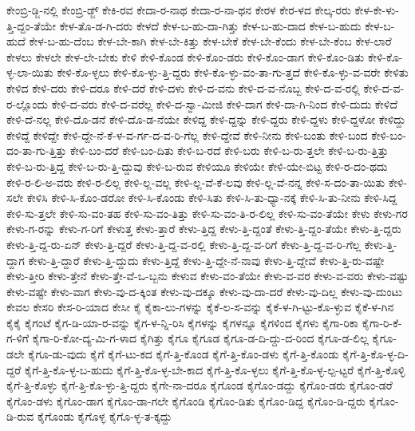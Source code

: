{ಕೇಂಬ್ರಿ-ಡ್ಜಿ-ನಲ್ಲಿ
ಕೇಂಬ್ರಿ-ಡ್ಜ್
ಕೇಕಿ-ರವ
ಕೇದಾ-ರ-ನಾಥ
ಕೇದಾ-ರ-ನಾ-ಥನ
ಕೇರಳ
ಕೇರ-ಳದ
ಕೇಲ್ಕ-ರರು
ಕೇಳ-ಕೇ-ಳು-ತ್ತಿ-ದ್ದಂ-ತೆಯೇ
ಕೇಳ-ತೊ-ಡ-ಗಿ-ದರು
ಕೇಳದೆ
ಕೇಳ-ಬ-ಹು-ದಾ-ಗಿತ್ತು
ಕೇಳ-ಬ-ಹು-ದಾದ
ಕೇಳ-ಬ-ಹುದು
ಕೇಳ-ಬ-ಹುದೆ
ಕೇಳ-ಬ-ಹು-ದೆಂಬ
ಕೇಳ-ಬೇ-ಕಾಗಿ
ಕೇಳ-ಬೇ-ಕಿತ್ತು
ಕೇಳ-ಬೇಕೆ
ಕೇಳ-ಬೇ-ಕೆಂದು
ಕೇಳ-ಬೇ-ಕೆಂಬ
ಕೇಳ-ಲಾರೆ
ಕೇಳಲು
ಕೇಳಲೇ
ಕೇಳ-ಲೇ-ಬೇಕು
ಕೇಳಿ
ಕೇಳಿ-ಕೊಂಡ
ಕೇಳಿ-ಕೊಂ-ಡರು
ಕೇಳಿ-ಕೊಂ-ಡಾಗ
ಕೇಳಿ-ಕೊಂ-ಡಿತು
ಕೇಳಿ-ಕೊ-ಳ್ಳ-ಲಾ-ಯಿತು
ಕೇಳಿ-ಕೊ-ಳ್ಳಲು
ಕೇಳಿ-ಕೊ-ಳ್ಳು-ತ್ತಿ-ದ್ದರು
ಕೇಳಿ-ಕೊ-ಳ್ಳು-ವಂ-ತಾ-ಗು-ತ್ತದೆ
ಕೇಳಿ-ಕೊ-ಳ್ಳು-ವ-ವರೇ
ಕೇಳಿತು
ಕೇಳಿದ
ಕೇಳಿ-ದರು
ಕೇಳಿ-ದರೂ
ಕೇಳಿ-ದರೆ
ಕೇಳಿ-ದಳು
ಕೇಳಿ-ದ-ವನು
ಕೇಳಿ-ದ-ವ-ನೊಬ್ಬ
ಕೇಳಿ-ದ-ವ-ರಲ್ಲಿ
ಕೇಳಿ-ದ-ವ-ರ-ಲ್ಲೊಂದು
ಕೇಳಿ-ದ-ವರು
ಕೇಳಿ-ದ-ವರೆಲ್ಲ
ಕೇಳಿ-ದ-ಸ್ವಾ-ಮೀಜಿ
ಕೇಳಿ-ದಾಗ
ಕೇಳಿ-ದಾ-ಗಿ-ನಿಂದ
ಕೇಳಿ-ದುದು
ಕೇಳಿದೆ
ಕೇಳಿ-ದೆ-ನಲ್ಲ
ಕೇಳಿ-ದೊ-ಡನೆ
ಕೇಳಿ-ದೊ-ಡ-ನೆಯೇ
ಕೇಳಿದ್ದ
ಕೇಳಿ-ದ್ದನ್ನು
ಕೇಳಿ-ದ್ದರು
ಕೇಳಿ-ದ್ದಳು
ಕೇಳಿ-ದ್ದಳೋ
ಕೇಳಿದ್ದು
ಕೇಳಿದ್ದೆ
ಕೇಳಿದ್ದೇ
ಕೇಳಿ-ದ್ದೇ-ನೆ-ಕೆ-ಳ-ವ-ರ್ಗ-ದ-ವ-ರಿ-ಗೆಲ್ಲ
ಕೇಳಿ-ದ್ದೇವೆ
ಕೇಳಿ-ನೀನು
ಕೇಳಿ-ಬಂತು
ಕೇಳಿ-ಬಂದ
ಕೇಳಿ-ಬಂ-ದಂ-ತಾ-ಗು-ತ್ತಿತ್ತು
ಕೇಳಿ-ಬಂ-ದರೆ
ಕೇಳಿ-ಬಂ-ದಿತು
ಕೇಳಿ-ಬ-ರದೆ
ಕೇಳಿ-ಬರು
ಕೇಳಿ-ಬ-ರು-ತ್ತಲೇ
ಕೇಳಿ-ಬ-ರು-ತ್ತಿತ್ತು
ಕೇಳಿ-ಬ-ರು-ತ್ತಿದ್ದ
ಕೇಳಿ-ಬ-ರು-ತ್ತಿ-ದ್ದುವು
ಕೇಳಿ-ಬ-ರುವ
ಕೇಳಿಯೂ
ಕೇಳಿಯೇ
ಕೇಳಿ-ಯೇ-ಬಿಟ್ಟ
ಕೇಳಿ-ರ-ದಂ-ಥದು
ಕೇಳಿ-ರ-ಲಿ-ಅ-ವರು
ಕೇಳಿ-ರ-ಲಿಲ್ಲ
ಕೇಳಿ-ಲ್ಲ-ವಲ್ಲ
ಕೇಳಿ-ಲ್ಲ-ವೆ-ಕೆ-ಲವು
ಕೇಳಿ-ಲ್ಲ-ವೆ-ನನ್ನ
ಕೇಳಿ-ಸ-ದಂ-ತಾ-ಯಿತು
ಕೇಳಿ-ಸಲೇ
ಕೇಳಿಸಿ
ಕೇಳಿ-ಸಿ-ಕೊಂ-ಡರೋ
ಕೇಳಿ-ಸಿ-ಕೊಂಡು
ಕೇಳಿ-ಸಿತು
ಕೇಳಿ-ಸಿ-ತು-ಧ್ಯಾ-ನಕ್ಕೆ
ಕೇಳಿ-ಸಿ-ತು-ನೀನು
ಕೇಳಿ-ಸಿದ್ದ
ಕೇಳಿ-ಸು-ತ್ತಲೇ
ಕೇಳಿ-ಸು-ವಂ-ತಹ
ಕೇಳಿ-ಸು-ವಂ-ತಿತ್ತು
ಕೇಳಿ-ಸು-ವಂ-ತಿ-ರ-ಲಿಲ್ಲ
ಕೇಳಿ-ಸು-ವಂ-ತೆಯೇ
ಕೇಳು
ಕೇಳು-ಗರ
ಕೇಳು-ಗ-ರನ್ನು
ಕೇಳು-ಗ-ರಿಗೆ
ಕೇಳುತ್ತ
ಕೇಳು-ತ್ತಾರೆ
ಕೇಳು-ತ್ತಿದ್ದ
ಕೇಳು-ತ್ತಿ-ದ್ದಂತೆ
ಕೇಳು-ತ್ತಿ-ದ್ದಂ-ತೆಯೇ
ಕೇಳು-ತ್ತಿ-ದ್ದರು
ಕೇಳು-ತ್ತಿ-ದ್ದ-ರು-ಏನ್
ಕೇಳು-ತ್ತಿ-ದ್ದರೆ
ಕೇಳು-ತ್ತಿ-ದ್ದ-ವ-ರಲ್ಲಿ
ಕೇಳು-ತ್ತಿ-ದ್ದ-ವ-ರಿಗೆ
ಕೇಳು-ತ್ತಿ-ದ್ದ-ವ-ರಿ-ಗೆಲ್ಲ
ಕೇಳು-ತ್ತಿ-ದ್ದಾಗ
ಕೇಳು-ತ್ತಿ-ದ್ದಾರೆ
ಕೇಳು-ತ್ತಿ-ದ್ದುದು
ಕೇಳು-ತ್ತಿದ್ದೆ
ಕೇಳು-ತ್ತಿ-ದ್ದೇ-ನೆ-ನಾವು
ಕೇಳು-ತ್ತಿ-ದ್ದೇವೆ
ಕೇಳು-ತ್ತಿ-ರು-ವಷ್ಟೇ
ಕೇಳು-ತ್ತೀರಿ
ಕೇಳು-ತ್ತೇನೆ
ಕೇಳು-ತ್ತೇ-ವೆ-ಒ-ಬ್ಬನು
ಕೇಳುವ
ಕೇಳು-ವಂ-ತೆಯೇ
ಕೇಳು-ವ-ವರ
ಕೇಳು-ವ-ವರು
ಕೇಳು-ವಷ್ಟು
ಕೇಳು-ವಷ್ಟೇ
ಕೇಳು-ವಾಗ
ಕೇಳು-ವು-ದ-ಕ್ಕಿಂತ
ಕೇಳು-ವು-ದಕ್ಕೂ
ಕೇಳು-ವು-ದಾ-ದರೆ
ಕೇಳು-ವು-ದಿಲ್ಲ
ಕೇಳು-ವು-ದುಂಟು
ಕೇವಲ
ಕೇಸರಿ
ಕೇಸ-ರಿ-ಯಾದ
ಕೇಸೀ
ಕೈ
ಕೈಕಾ-ಲು-ಗಳನ್ನು
ಕೈಕೆ-ಲ-ಸ-ವನ್ನು
ಕೈಕೆ-ಳ-ಗಿ-ಟ್ಟು-ಕೊ-ಳ್ಳುವ
ಕೈಕೆ-ಳ-ಗಿನ
ಕೈಕೈ
ಕೈಗಂಟೆ
ಕೈಗ-ಡಿ-ಯಾ-ರ-ವನ್ನು
ಕೈಗ-ಳ-ನ್ನಿ-ರಿಸಿ
ಕೈಗಳನ್ನು
ಕೈಗಳನ್ನೂ
ಕೈಗಳಿಂದ
ಕೈಗಳು
ಕೈಗಾ-ರಿಕಾ
ಕೈಗಾ-ರಿ-ಕೆ-ಗ-ಳಿಗೆ
ಕೈಗಾ-ರಿ-ಕೋ-ದ್ಯ-ಮಿ-ಗ-ಳಾದ
ಕೈಗಿತ್ತು
ಕೈಗೂ
ಕೈಗೂಡ
ಕೈಗೂ-ಡ-ದಿ-ದ್ದು-ದ-ರಿಂದ
ಕೈಗೂ-ಡ-ಲಿಲ್ಲ
ಕೈಗೂ-ಡಲೇ
ಕೈಗೂ-ಡು-ವುದು
ಕೈಗೆ
ಕೈಗೆ-ಟು-ಕದ
ಕೈಗೆ-ತ್ತಿ-ಕೊಂಡ
ಕೈಗೆ-ತ್ತಿ-ಕೊಂ-ಡಳು
ಕೈಗೆ-ತ್ತಿ-ಕೊಂಡು
ಕೈಗೆ-ತ್ತಿ-ಕೊ-ಳ್ಳ-ದಿ-ದ್ದರೆ
ಕೈಗೆ-ತ್ತಿ-ಕೊ-ಳ್ಳ-ಬ-ಹುದು
ಕೈಗೆ-ತ್ತಿ-ಕೊ-ಳ್ಳ-ಬೇ-ಕಾದ
ಕೈಗೆ-ತ್ತಿ-ಕೊ-ಳ್ಳಲು
ಕೈಗೆ-ತ್ತಿ-ಕೊ-ಳ್ಳ-ಲ್ಪ-ಟ್ಟರೆ
ಕೈಗೆ-ತ್ತಿ-ಕೊಳ್ಳಿ
ಕೈಗೆ-ತ್ತಿ-ಕೊಳ್ಳು
ಕೈಗೆ-ತ್ತಿ-ಕೊ-ಳ್ಳು-ತ್ತಿ-ದ್ದರು
ಕೈಗೇ-ನಾ-ದರೂ
ಕೈಗೊಂಡ
ಕೈಗೊಂ-ಡದ್ದು
ಕೈಗೊಂ-ಡರು
ಕೈಗೊಂ-ಡರೆ
ಕೈಗೊಂ-ಡಳು
ಕೈಗೊಂ-ಡಾಗ
ಕೈಗೊಂ-ಡಾ-ಗಲೇ
ಕೈಗೊಂಡಿ
ಕೈಗೊಂ-ಡಿತು
ಕೈಗೊಂ-ಡಿದ್ದ
ಕೈಗೊಂ-ಡಿ-ದ್ದರು
ಕೈಗೊಂ-ಡಿ-ರುವ
ಕೈಗೊಂಡು
ಕೈಗೊಳ್ಳ
ಕೈಗೊ-ಳ್ಳ-ತ-ಕ್ಕದ್ದು
}
